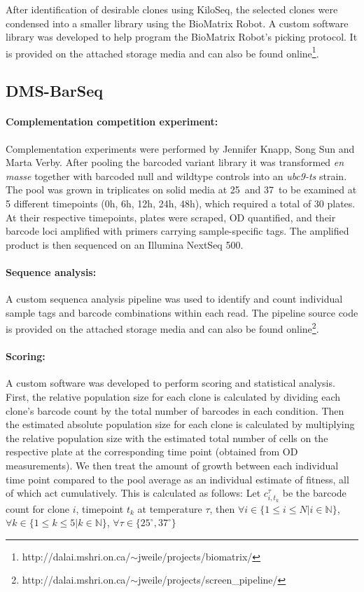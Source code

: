 After identification of desirable clones using KiloSeq, the selected clones were condensed into a smaller library using the BioMatrix Robot. A custom software library was developed to help program the BioMatrix Robot's picking protocol. It is provided on the attached storage media and can also be found online\footnote{http://dalai.mshri.on.ca/$\sim$jweile/projects/biomatrix/}.

\subsection{DMS-BarSeq}

\paragraph{Complementation competition experiment:} Complementation experiments were performed by Jennifer Knapp, Song Sun and Marta Verby. After pooling the barcoded  variant library it was transformed \textit{en masse} together with barcoded null and wildtype controls into an  \textit{ubc9-ts} strain. 
The pool was grown in triplicates on solid media at 25\celsius\ and 37\celsius\ to be examined at 5 different timepoints (0h, 6h, 12h, 24h, 48h), which required a total of 30 plates. At their respective timepoints, plates were scraped, OD quantified, and their barcode loci amplified with primers carrying sample-specific tags. The amplified product is then sequenced on an Illumina NextSeq 500.

\paragraph{Sequence analysis:}A custom sequenca analysis pipeline was used to identify and count individual sample tags and barcode combinations within each read. The pipeline source code is provided on the attached storage media and can also be found online\footnote{http://dalai.mshri.on.ca/$\sim$jweile/projects/screen\_pipeline/}.

\paragraph{Scoring:} A custom software was developed to perform scoring and statistical analysis. First, the relative population size for each clone is calculated by dividing each clone's barcode count by the total number of barcodes in each condition. Then the estimated absolute population size for each clone is calculated by multiplying the relative population size with the estimated total number of cells on the respective plate at the corresponding time point (obtained from OD measurements). We then treat the amount of growth between each individual time point compared to the pool average as an individual estimate of fitness, all of which act cumulatively. This is calculated as follows: Let $c_{i,t_k}^\tau$ be the barcode count for clone $i$, timepoint $t_k$ at temperature $\tau$, then $ \forall i \in \{1 \le i \le N | i \in \mathbb{N} \}$, 
$\forall k \in \{1 \le k \le 5 | k \in \mathbb{N} \}$, 
$\forall \tau \in \{25^{\circ},37^{\circ} \}$

